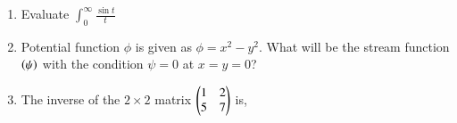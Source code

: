 \documentclass[journal,12pt,onecolumn]{IEEEtran}
\theoremstyle{remark}
\begin{document}
\begin{enumerate}
\hfill{}
\begin{enumerate}
\end{enumerate}

\item Evaluate $\int_{0}^{\infty}\frac{\sin{t}}{t}$

\hfill{}
\begin{enumerate}
\end{enumerate}

\item Potential function $\phi$ is given as $\phi=x^2-y^2$. What will be the stream function $\left(\psi\right)$ with the condition $\psi=0$ at $x=y=0$?

\hfill{}
\begin{enumerate}
\end{enumerate}

\item The inverse of the $2\times 2$ matrix $\begin{pmatrix}1&2\\5&7\end{pmatrix}$ is,

\hfill{}
\begin{enumerate}
\end{enumerate}


\end{enumerate}
\end{document}
